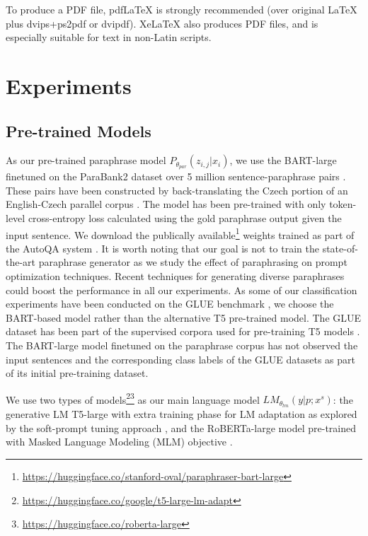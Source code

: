 \documentclass[11pt]{article}
\begin{document}
To produce a PDF file, pdf\LaTeX{} is strongly recommended (over original \LaTeX{} plus dvips+ps2pdf or dvipdf). Xe\LaTeX{} also produces PDF files, and is especially suitable for text in non-Latin scripts.


\section{Experiments}

\subsection{Pre-trained Models}
As our pre-trained paraphrase model $P_{\theta_{par}} (z_{i,j} | x_{i})$, we use the BART-large \cite{lewis-etal-2020-bart} finetuned on the ParaBank2 dataset over 5 million sentence-paraphrase pairs \cite{hu-etal-2019-large}. These pairs have been constructed by back-translating the Czech portion of an English-Czech parallel corpus \cite{hu-etal-2019-large}. The model has been pre-trained with only token-level cross-entropy loss calculated using the gold paraphrase output given the input sentence.  We download the publically available\footnote{\url{https://huggingface.co/stanford-oval/paraphraser-bart-large}} weights trained as part of the AutoQA system \cite{xu-etal-2020-autoqa}. It is worth noting that our goal is not to train the state-of-the-art paraphrase generator as we study the effect of paraphrasing on prompt optimization techniques. Recent techniques for generating diverse paraphrases \cite{zhou-bhat-2021-paraphrase} could boost the performance in all our experiments. As some of our classification experiments have been conducted on the GLUE benchmark \cite{DBLP:journals/corr/abs-1804-07461}, we choose the BART-based model rather than the alternative T5 pre-trained model. The GLUE dataset has been part of the supervised corpora used for pre-training T5 models \cite{DBLP:journals/corr/abs-1910-10683}. The BART-large model finetuned on the paraphrase corpus has not observed the input sentences and the corresponding class labels of the GLUE datasets as part of its initial pre-training dataset.

We use two types of models\footnote{\url{https://huggingface.co/google/t5-large-lm-adapt}}\footnote{\url{https://huggingface.co/roberta-large}} as our main language model $LM_{\theta_{lm}} (y | p ; x^{s})$: the generative LM T5-large with extra training phase for LM adaptation as explored by the soft-prompt tuning approach \cite{lester-etal-2021-power}, and the RoBERTa-large model pre-trained with Masked Language Modeling (MLM) objective \cite{DBLP:journals/corr/abs-1907-11692}.
\end{document}
